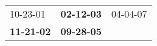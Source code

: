 \begin{supertabular}{p{0.33\columnwidth}p{0.33\columnwidth}p{0.33\columnwidth}}
          10-23-01\textsuperscript{} &  \textbf{02-12-03\textsuperscript{}} &  04-04-07\textsuperscript{} \\
 \textbf{11-21-02\textsuperscript{}} &  \textbf{09-28-05\textsuperscript{}} &                             \\
\end{supertabular}
